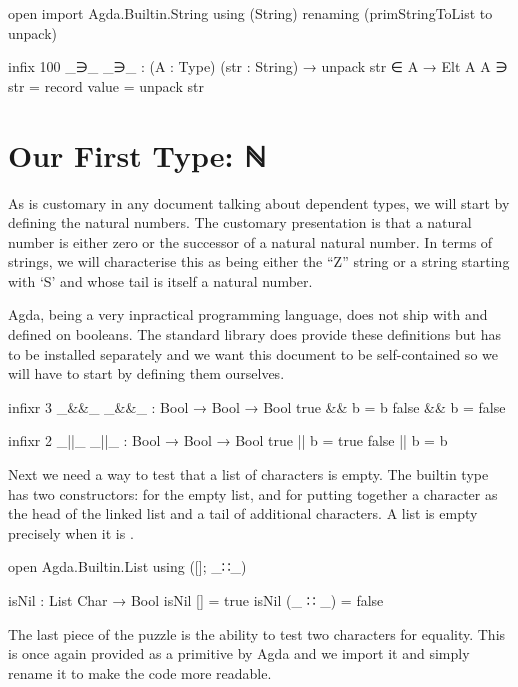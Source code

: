 \documentclass[twocolumn]{article}
\begin{document}
\begin{code}
open import Agda.Builtin.String using (String)
  renaming (primStringToList to unpack)

infix 100 _∋_
_∋_ : (A : Type) (str : String) →
      {{unpack str ∈ A}} → Elt A
A ∋ str = record { value = unpack str }
\end{code}


\section{Our First Type: ℕ}

As is customary in any document talking about dependent types, we will start
by defining the natural numbers. The customary presentation is that a natural
number is either zero or the successor of a natural natural number. In terms
of strings, we will characterise this as being either the ``Z'' string or a
string starting with `S' and whose tail is itself a natural number.

Agda, being a very inpractical programming language, does not ship with
\AF{\_\&\&\_} and \AF{\_||\_} defined on booleans.
The standard library does provide these definitions but has to be installed
separately and we want this document to be self-contained so we will have
to start by defining them ourselves.

\begin{code}
infixr 3 _&&_
_&&_ : Bool → Bool → Bool
true   && b = b
false  && b = false

infixr 2 _||_
_||_ : Bool → Bool → Bool
true   || b = true
false  || b = b
\end{code}

Next we need a way to test that a list of characters is empty.
The builtin type  has two constructors: \AIC{[]} for the
empty list, and  for putting together a character as the
head of the linked list and a tail of additional characters. A list is
empty precisely when it is \AIC{[]}.

\begin{code}
open Agda.Builtin.List using ([]; _∷_)

isNil : List Char → Bool
isNil []       = true
isNil (_ ∷ _)  = false
\end{code}

The last piece of the puzzle is the ability to test two characters
for equality. This is once again provided as a primitive by Agda and
we import it and simply rename it to make the code more readable.
\end{document}
